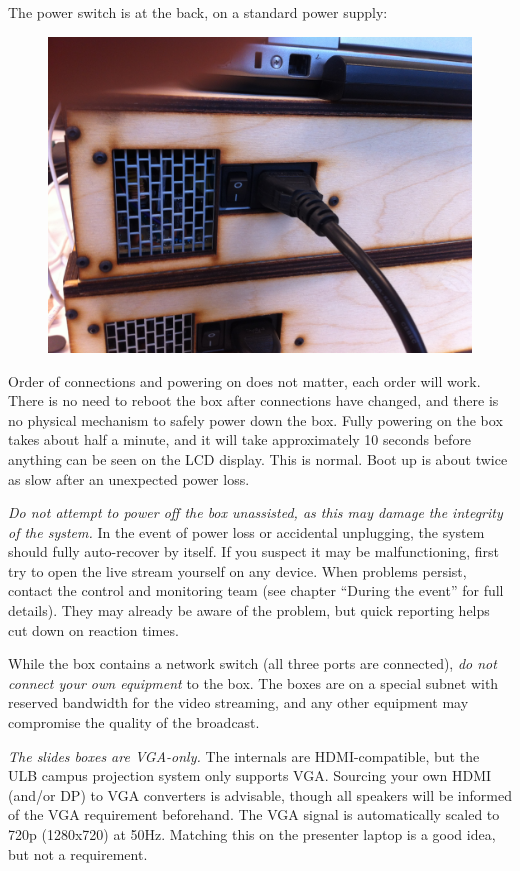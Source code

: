 \documentclass{article}
\begin{document}
The power switch is at the back, on a standard power supply:
\begin{figure}[H]
  \centering
  \includegraphics[width = 120mm]{videobox_psu.jpg}
\end{figure}

Order of connections and powering on does not matter, each order will work. There is no need to reboot the box after connections have changed, and there is no physical mechanism to safely power down the box.
Fully powering on the box takes about half a minute, and it will take approximately 10 seconds before anything can be seen on the LCD display. This is normal. Boot up is about twice as slow after an unexpected power loss.

\emph{Do not attempt to power off the box unassisted, as this may damage the integrity of the system.}
In the event of power loss or accidental unplugging, the system should fully auto-recover by itself. If you suspect it may be malfunctioning, first try to open the live stream yourself on any device. When problems persist, contact the control and monitoring team (see chapter ``During the event'' for full details). They may already be aware of the problem, but quick reporting helps cut down on reaction times.

While the box contains a network switch (all three ports are connected), \emph{do not connect your own equipment} to the box. The boxes are on a special subnet with reserved bandwidth for the video streaming, and any other equipment may compromise the quality of the broadcast.

\emph{The slides boxes are VGA-only.}
The internals are HDMI-compatible, but the ULB campus projection system only supports VGA.
Sourcing your own HDMI (and/or DP) to VGA converters is advisable, though all speakers will be informed of the VGA requirement beforehand.
The VGA signal is automatically scaled to 720p (1280x720) at 50Hz. Matching this on the presenter laptop is a good idea, but not a requirement.
\end{document}
